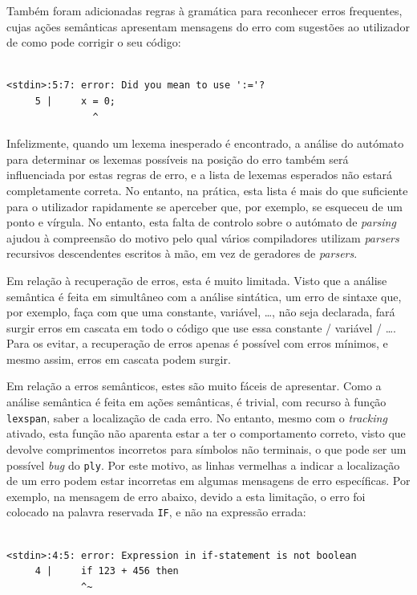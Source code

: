 \documentclass[12pt, a4paper]{article}
\begin{document}
Também foram adicionadas regras à gramática para reconhecer erros frequentes, cujas ações semânticas
apresentam mensagens do erro com sugestões ao utilizador de como pode corrigir o seu código:

\begin{lstlisting}

<stdin>:5:7: error: Did you mean to use ':='?
     5 |     x = 0;
               ^
\end{lstlisting}

Infelizmente, quando um lexema inesperado é encontrado, a análise do autómato para determinar os
lexemas possíveis na posição do erro também será influenciada por estas regras de erro, e a lista
de lexemas esperados não estará completamente correta. No entanto, na prática, esta lista é mais
do que suficiente para o utilizador rapidamente se aperceber que, por exemplo, se esqueceu de um
ponto e vírgula. No entanto, esta falta de controlo sobre o autómato de \emph{parsing} ajudou à
compreensão do motivo pelo qual vários compiladores utilizam \emph{parsers} recursivos descendentes
escritos à mão, em vez de geradores de \emph{parsers}. \cite{compilers-handwritten-parser}

Em relação à recuperação de erros, esta é muito limitada. Visto que a análise semântica é feita em
simultâneo com a análise sintática, um erro de sintaxe que, por exemplo, faça com que uma constante,
variável, \ldots, não seja declarada, fará surgir erros em cascata em todo o código que use essa
constante / variável / \ldots. Para os evitar, a recuperação de erros apenas é possível com erros
mínimos, e mesmo assim, erros em cascata podem surgir.

Em relação a erros semânticos, estes são muito fáceis de apresentar. Como a análise semântica é
feita em ações semânticas, é trivial, com recurso à função \texttt{lexspan}, saber a localização de
cada erro. No entanto, mesmo com o \emph{tracking} ativado, esta função não aparenta estar a ter o
comportamento correto, visto que devolve comprimentos incorretos para símbolos não terminais, o que
pode ser um possível \emph{bug} do \texttt{ply}. Por este motivo, as linhas vermelhas a indicar a
localização de um erro podem estar incorretas em algumas mensagens de erro específicas. Por exemplo,
na mensagem de erro abaixo, devido a esta limitação, o erro foi colocado na palavra reservada
\texttt{IF}, e não na expressão errada:

\begin{lstlisting}

<stdin>:4:5: error: Expression in if-statement is not boolean
     4 |     if 123 + 456 then
             ^~
\end{lstlisting}
\end{document}
